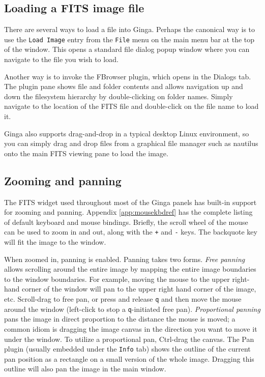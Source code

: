 \documentclass[11pt]{report}
\begin{document}
\subsection{Loading a FITS image file}
There are several ways to load a file into Ginga.  Perhaps the canonical
way is to use the {\tt Load Image} entry from the {\tt File} menu on the
main menu bar at the top of the window.  This opens a standard file
dialog popup window where you can navigate to the file you wish to load.

Another way is to invoke the FBrowser plugin, which opens in the Dialogs
tab.  The plugin pane shows file and folder contents and allows
navigation up and down the filesystem hierarchy by double-clicking on
folder names.   Simply navigate to the location of the FITS file and
double-click on the file name to load it.

Ginga also supports drag-and-drop in a typical desktop Linux
environment, so you can simply drag and drop files from a graphical file
manager such as nautilus onto the main FITS viewing pane to load the image.

\subsection{Zooming and panning}
The FITS widget used throughout most of the Ginga panels has built-in
support for zooming and panning.  Appendix \ref{app:mousekbdref} has the
complete listing of default keyboard and mouse bindings.  
Briefly, the scroll wheel of the mouse can be used to zoom in and out,
along with the {\tt +} and {\tt -} keys.  The backquote key will fit the
image to the window.

When zoomed in, panning is enabled.  Panning takes two forms.
\emph{Free panning} allows scrolling around the entire image by mapping
the entire image boundaries to the window boundaries.  For example,
moving the mouse to the upper right-hand corner of the window will pan to
the upper right hand corner of the image, etc.  Scroll-drag to free pan,
or press and release {\tt q} and then move the mouse around the window
(left-click to stop a {\tt q}-initiated free pan).
\emph{Proportional panning} pans the image in direct proportion to the
distance the mouse is moved; a common idiom is dragging the image canvas in
the direction you want to move it under the window.  To utilize a
proportional pan, Ctrl-drag the canvas.  The Pan plugin (usually
embedded under the {\tt Info} tab) shows the outline of the current pan
position as a rectangle on a small version of the whole image. 
Dragging this outline will also pan the image in the main window.
\end{document}
